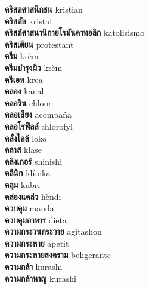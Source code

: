 \textbf{ คริสตศาสนิกชน  } kristian \\
\textbf{ คริสตัล  } kristal \\
\textbf{ คริสต์ศาสนานิกายโรมันคาทอลิก  } katolisismo \\
\textbf{ คริสเตียน  } protestant \\
\textbf{ ครีม  } krèm \\
\textbf{ ครีมบำรุงผิว  } krèm \\
\textbf{ ครีเอท  } krea \\
\textbf{ คลอง  } kanal \\
\textbf{ คลอรีน  } chloor \\
\textbf{ คลอเสียง  } acompaña \\
\textbf{ คลอโรฟีลล์  } chlorofyl \\
\textbf{ คลั่งไคล้  } loko \\
\textbf{ คลาส  } klase \\
\textbf{ คลิงเกอร์  } shinishi \\
\textbf{ คลินิก  } klínika \\
\textbf{ คลุม  } kubri \\
\textbf{ คล่องแคล่ว  } hèndi \\
\textbf{ ควบคุม  } manda \\
\textbf{ ควบคุมอาหาร  } dieta \\
\textbf{ ความกระวนกระวาย  } agitashon \\
\textbf{ ความกระหาย  } apetit \\
\textbf{ ความกระหายสงคราม  } beligerante \\
\textbf{ ความกล้า  } kurashi \\
\textbf{ ความกล้าหาญ  } kurashi \\
